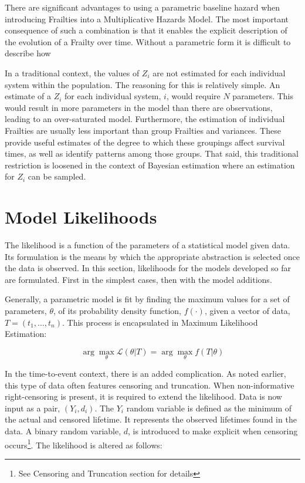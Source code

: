 There are significant advantages to using a parametric baseline hazard when introducing Frailties into a Multiplicative Hazards Model. The most important consequence of such a combination is that it enables the explicit description of the evolution of a Frailty over time. Without a parametric form it is difficult to describe how 

In a traditional context, the values of $Z_i$ are not estimated for each individual system within the population. The reasoning for this is relatively simple. An estimate of a $Z_i$ for each individual system, $i$, would require $N$ parameters. This would result in more parameters in the model than there are observations, leading to an over-saturated model. Furthermore, the estimation of individual Frailties are usually less important than group Frailties and variances. These provide useful estimates of the degree to which these groupings affect survival times, as well as identify patterns among those groups. That said, this traditional restriction is loosened in the context of Bayesian estimation where an estimation for $Z_i$ can be sampled.





\section*{Model Likelihoods}

The likelihood is a function of the parameters of a statistical model given data. Its formulation is the means by which the appropriate abstraction is selected once the data is observed. In this section, likelihoods for the models developed so far are formulated. First in the simplest cases, then with the model additions.

Generally, a parametric model is fit by finding the maximum values for a set of parameters, $\theta$, of its probability density function, $f(\cdot)$, given a vector of data, $T = (t_1, \dots, t_n)$. This process is encapsulated in Maximum Likelihood Estimation:

$$ {\displaystyle \arg \max _{\theta }{\mathcal {L}}(\theta | T)=\arg \max _{\theta }f(T|\theta )} $$

In the time-to-event context, there is an added complication. As noted earlier, this type of data often features censoring and truncation. When non-informative right-censoring is present, it is required to extend the likelihood. Data is now input as a pair, $(Y_i, d_i)$. The $Y_i$ random variable is defined as the minimum of the actual and censored lifetime. It represents the observed lifetimes found in the data. A binary random variable, $d$, is introduced to make explicit when censoring occurs\footnote{See Censoring and Truncation section for details}. The likelihood is altered as follows:

